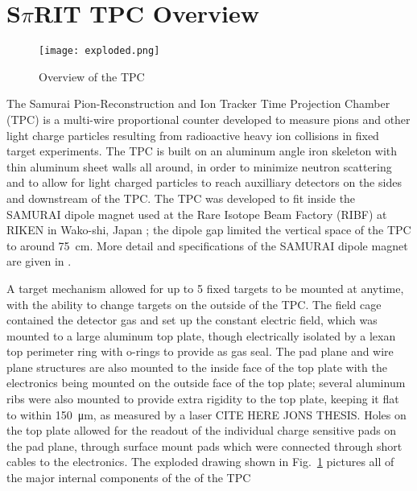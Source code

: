 \section{S$\pi$RIT TPC Overview}

\begin{figure}[!htb]
\texttt{[image: exploded.png]}
\caption{Overview of the \spirit TPC}
\label{fig:tpcExplode}
\end{figure}


The Samurai Pion-Reconstruction and Ion Tracker Time Projection Chamber (\spirit TPC) is a multi-wire proportional counter developed to measure pions and other light charge particles resulting from radioactive heavy ion collisions in fixed target experiments.  The TPC is built on an aluminum angle iron skeleton with thin aluminum sheet walls all around, in order to minimize neutron scattering and to allow for light charged particles to reach auxilliary detectors on the sides and downstream of the TPC. The \spirit TPC was developed to fit inside the SAMURAI dipole magnet used at the Rare Isotope Beam Factory (RIBF) at RIKEN in Wako-shi, Japan \cite{riken}; the dipole gap limited the vertical space of the TPC to around \SI{75}{\centi\metre}. More detail and specifications of the SAMURAI dipole magnet are given in \cite{samurai}. 

A target mechanism allowed for up to 5 fixed targets to be mounted at anytime, with the ability to change targets on the outside of the TPC. The field cage contained the detector gas and set up the constant electric field, which was mounted to a large aluminum top plate, though electrically isolated by a lexan top perimeter ring with o-rings to provide as gas seal. The pad plane and wire plane structures are also mounted to the inside face of the top plate with the electronics being mounted on the outside face of the top plate; several aluminum ribs were also mounted to provide extra rigidity to the top plate, keeping it flat to within \SI{150}{\micro\metre}, as measured by a laser CITE HERE JONS THESIS. Holes on the top plate allowed for the readout of the individual charge sensitive pads on the pad plane, through surface mount pads which were connected through short cables to the electronics. The exploded drawing shown in Fig.~\ref{fig:tpcExplode} pictures all of the major internal components of the  of the \spirit TPC


